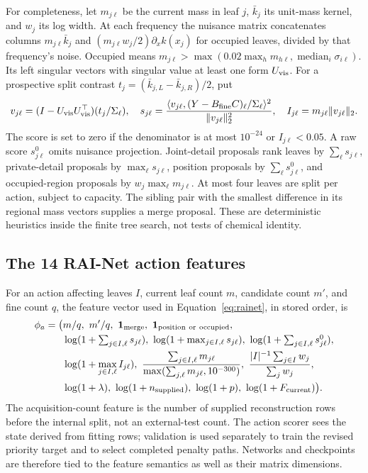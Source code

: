 For completeness, let $m_{j\ell}$ be the current mass in leaf $j$, $\bar k_j$ its unit-mass kernel, and $w_j$ its log width. At each frequency the nuisance matrix concatenates columns $m_{j\ell}\bar k_j$ and $(m_{j\ell}w_j/2)\partial_x k(x_j)$ for occupied leaves, divided by that frequency's noise. Occupied means $m_{j\ell}>\max(0.02\max_hm_{h\ell},\operatorname{median}_i\sigma_{i\ell})$. Its left singular vectors with singular value at least one form $U_{\rm vis}$. For a prospective split contrast $t_j=(\bar k_{j,L}-\bar k_{j,R})/2$, put
\begin{equation}\label{eq:haarscore}
 v_{j\ell}=(I-U_{\rm vis}U_{\rm vis}^\top)(t_j/\Sigma_\ell),\quad
 s_{j\ell}=\frac{\langle v_{j\ell},(Y-B_{\rm fine}C)_\ell/\Sigma_\ell\rangle^2}
 {\|v_{j\ell}\|_2^2},\quad I_{j\ell}=m_{j\ell}\|v_{j\ell}\|_2.
\end{equation}
The score is set to zero if the denominator is at most $10^{-24}$ or $I_{j\ell}<0.05$. A raw score $s^0_{j\ell}$ omits nuisance projection. Joint-detail proposals rank leaves by $\sum_\ell s_{j\ell}$, private-detail proposals by $\max_\ell s_{j\ell}$, position proposals by $\sum_\ell s^0_{j\ell}$, and occupied-region proposals by $w_j\max_\ell m_{j\ell}$. At most four leaves are split per action, subject to capacity. The sibling pair with the smallest difference in its regional mass vectors supplies a merge proposal. These are deterministic heuristics inside the finite tree search, not tests of chemical identity.

\subsection{The 14 RAI-Net action features}\label{app:netfeatures}
For an action affecting leaves $I$, current leaf count $m$, candidate count $m'$, and fine count $q$, the feature vector used in Equation~\eqref{eq:rainet}, in stored order, is
\begin{align}\label{eq:netfeatures}
 \phi_a=\big(&m/q,\ m'/q,\ \one_{\rm merge},\ \one_{\rm position\ or\ occupied},\nonumber\\
 &\log(1+\textstyle\sum_{j\in I,\ell}s_{j\ell}),\
 \log(1+\max_{j\in I,\ell}s_{j\ell}),\
 \log(1+\textstyle\sum_{j\in I,\ell}s^0_{j\ell}),\nonumber\\
 &\log(1+\max_{j\in I,\ell}I_{j\ell}),\
 \frac{\sum_{j\in I,\ell}m_{j\ell}}{\max(\sum_{j,\ell}m_{j\ell},10^{-300})},\
 \frac{|I|^{-1}\sum_{j\in I}w_j}{\sum_jw_j},\nonumber\\
 &\log(1+\lambda),\ \log(1+n_{\rm supplied}),\ \log(1+p),\ \log(1+F_{\rm current})\big).
\end{align}
The acquisition-count feature is the number of supplied reconstruction rows before the internal split, not an external-test count. The action scorer sees the state derived from fitting rows; validation is used separately to train the revised priority target and to select completed penalty paths. Networks and checkpoints are therefore tied to the feature semantics as well as their matrix dimensions.


